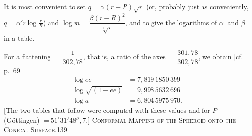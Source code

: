 \par\endgroup
It is most convenient to set $q=\alpha(r-R)\sqrt r$ (or, probably just as conveniently, $q=\alpha'r\log\frac rR$) and $\log m=\dfrac{\beta(r-R)^2}{\sqrt[3]r}$, and to give the logarithms of $\alpha$ [and $\beta$] in a table.

For a flattening $=\dfrac1{302{,}78}$, that is, a ratio of the axes $=\dfrac{301{,}78}{302{,}78}$, we obtain [cf. p.~69]
\[
\begin{aligned}
\log ee&=7{,}819\,1850\,399\\
\log\sqrt{(1-ee)}&=9{,}998\,5632\,696\\
\log a&=6{,}804\,5975\,970.
\end{aligned}
\]
[The two tables that follow were computed with these values and for $P$ (Göttingen) $=51^\circ31'48''{,}7$.]
\clearpage
\noindent\mbox{}\hfill{\small\textsc{Conformal Mapping of the Spheroid onto the Conical Surface.}}\hfill139\par\bigskip
